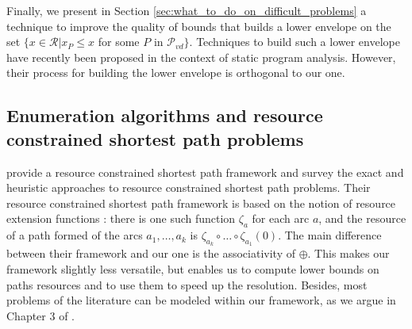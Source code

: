 \documentclass[11pt]{amsart}
\theoremstyle{plain}
\theoremstyle{remark}
\newcommand{\rplus}{\oplus}
\newcommand{\rleq}{\leqslant}
\newcommand{\rset}{\mathcal{R}}
\newcommand{\re}{x}
\begin{document}
Finally, we present in Section \ref{sec:what_to_do_on_difficult_problems} a technique to improve the quality of bounds that builds a lower envelope on the set $\{\re \in \rset| \re_{P} \rleq \re$ for some $P$ in $ \mathcal{P}_{vd}\}$. Techniques to build such a lower envelope have recently been proposed \citep{amato2016efficiently,apinis2013combine} in the context of static program analysis. However, their process for building the lower envelope is orthogonal to our one.











































\subsection{Enumeration algorithms and resource constrained shortest path problems} \label{sub:enumeration_algorithms_and_resource_constrained_shortest_path_problems}

\citet{irnich2005shortest} provide a resource constrained shortest path framework and survey the exact and heuristic approaches to resource constrained shortest path problems. Their resource constrained shortest path framework is based on the notion of resource extension functions \cite{irnich2008resource}: there is one such function $\zeta_{a}$ for each arc $a$, and the resource of a path formed of the arcs $a_{1},\ldots,a_{k}$ is $\zeta_{a_{k}}\circ \ldots \circ \zeta_{a_{1}}(0)$. The main difference between their framework and our one is the associativity of $\rplus$. This makes our framework slightly less versatile, but enables us to compute lower bounds on paths resources and to use them to speed up the resolution. Besides, most problems of the literature can be modeled within our framework, as we argue in Chapter 3 of \cite{parmentier2016thesis}.
\end{document}
